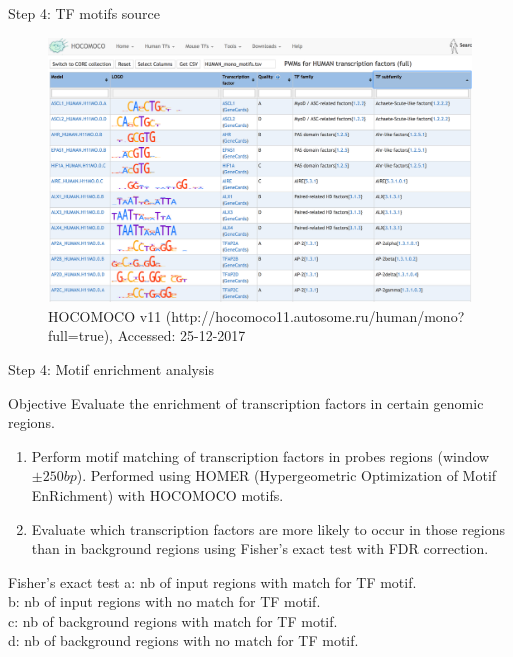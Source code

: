 \documentclass[slidestop,compress,11pt,xcolor=dvipsnames]{beamer}
\begin{document}
\begin{frame}{Step 4:  TF motifs source}
 \vspace*{-0.3cm}
 \begin{figure}
  \centering
  \includegraphics[width=1.0\linewidth]{ELMER/hocomoco.png}{\tiny{\\HOCOMOCO v11 (http://hocomoco11.autosome.ru/human/mono?full=true), Accessed: 25-12-2017}}
 \end{figure}
\end{frame}

\begin{frame}{Step 4: Motif enrichment analysis}

\begin{block}{Objective}
Evaluate the enrichment of transcription factors in certain genomic regions.
\begin{enumerate}
  \item Perform motif matching of transcription factors in probes regions (window $\pm250bp$). Performed using HOMER (Hypergeometric Optimization of Motif EnRichment) with HOCOMOCO motifs.
  \item Evaluate which transcription factors are more likely to occur in those regions than in background regions
  using Fisher’s exact test with FDR correction.
\end{enumerate}
\end{block}
 \begin{exampleblock}{Fisher’s exact test}
 a: nb of input regions with match for TF motif.\\
 b: nb of input regions with no match for TF motif.\\
 c: nb of background regions with match for TF motif.\\
 d: nb of background regions with no match for TF motif.
 \end{exampleblock}

\end{frame}
\end{document}
